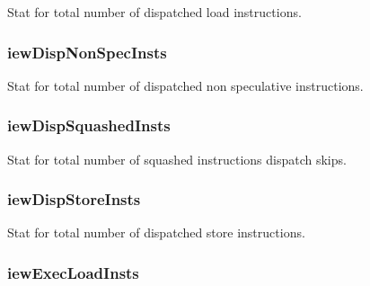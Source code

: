 Stat for total number of dispatched load instructions. \hypertarget{classDefaultIEW_ad97a775edfe3139e00cf90d6ce85cd6e}{
\subsubsection[{iewDispNonSpecInsts}]{ {\bf iewDispNonSpecInsts}}}
\label{classDefaultIEW_ad97a775edfe3139e00cf90d6ce85cd6e}
Stat for total number of dispatched non speculative instructions. \hypertarget{classDefaultIEW_a43a5c3a932fadd9d0cbcc8da45f6ec2e}{
\subsubsection[{iewDispSquashedInsts}]{ {\bf iewDispSquashedInsts}}}
\label{classDefaultIEW_a43a5c3a932fadd9d0cbcc8da45f6ec2e}
Stat for total number of squashed instructions dispatch skips. \hypertarget{classDefaultIEW_a014a1fbd4e241bc9c3eb4d926aaf1156}{
\subsubsection[{iewDispStoreInsts}]{ {\bf iewDispStoreInsts}}}
\label{classDefaultIEW_a014a1fbd4e241bc9c3eb4d926aaf1156}
Stat for total number of dispatched store instructions. \hypertarget{classDefaultIEW_ad576ced7a991ca05c24bc21fc9d70cdc}{
\subsubsection[{iewExecLoadInsts}]{ {\bf iewExecLoadInsts}}}
